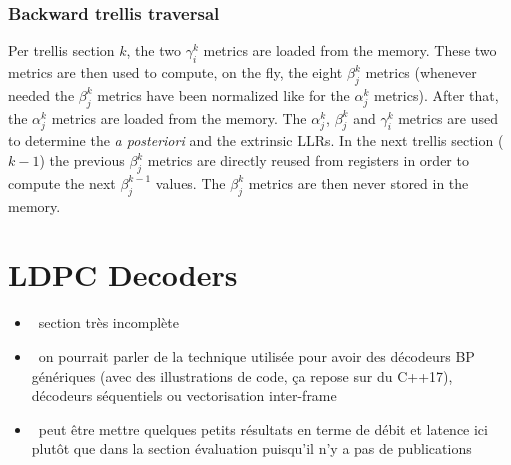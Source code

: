 \subsubsection{Backward trellis traversal}

Per trellis section $k$, the two $\gamma_i^k$ metrics are loaded from the
memory. These two metrics are then used to compute, on the fly, the eight
$\beta_j^k$ metrics (whenever needed the $\beta_j^k$ metrics have been
normalized like for the $\alpha_j^k$ metrics). After that, the $\alpha_j^k$
metrics are loaded from the memory. The $\alpha_j^k$, $\beta_j^k$ and
$\gamma_i^k$ metrics are used to determine the \textit{a posteriori} and the
extrinsic LLRs. In the next trellis section ($k-1$) the previous $\beta_j^k$
metrics are directly reused from registers in order to compute the next
$\beta_j^{k-1}$ values. The $\beta_j^k$ metrics are then never stored in the
memory.

\section{LDPC Decoders}

\begin{itemize}
  \item \xmark~section très incomplète
  \item \xmark~on pourrait parler de la technique utilisée pour avoir des
    décodeurs BP génériques (avec des illustrations de code, ça repose sur du
    C++17), décodeurs séquentiels ou vectorisation inter-frame
  \item \xmark~peut être mettre quelques petits résultats en terme de débit et
    latence ici plutôt que dans la section évaluation puisqu'il n'y a pas de
    publications
\end{itemize}


